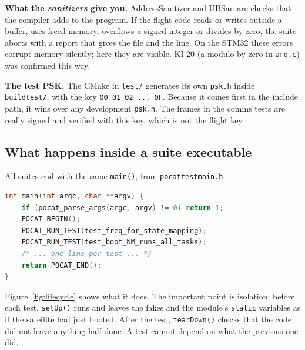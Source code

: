 \documentclass[11pt,a4paper]{article}
\DeclareRobustCommand{\_}{\textunderscore\allowbreak}
\newcommand{\cd}[1]{\texttt{#1}}
\begin{document}
\textbf{What the \emph{sanitizers} give you.} AddressSanitizer and UBSan are checks that
the compiler adds to the program. If the flight code reads or writes outside a buffer,
uses freed memory, overflows a signed integer or divides by zero, the suite
aborts with a report that gives the file and the line. On the STM32 these errors corrupt
memory silently; here they are visible. KI-20 (a modulo by zero in \cd{arq.c}) was confirmed
this way.

\textbf{The test PSK.} The CMake in \cd{test/} generates its own \cd{psk.h} inside
\cd{build\_test/}, with the key \cd{00 01 02 ... 0F}. Because it comes first in the include
path, it wins over any development \cd{psk.h}. The frames in the comms tests are
really signed and verified with this key, which is not the flight key.

\subsection{What happens inside a suite executable}

All suites end with the same \cd{main()}, from \cd{pocat\_test\_main.h}:
\begin{lstlisting}[language=C]
int main(int argc, char **argv) {
    if (pocat_parse_args(argc, argv) != 0) return 1;
    POCAT_BEGIN();
    POCAT_RUN_TEST(test_freq_for_state_mapping);
    POCAT_RUN_TEST(test_boot_NM_runs_all_tasks);
    /* ... one line per test ... */
    return POCAT_END();
}
\end{lstlisting}
Figure~\ref{fig:lifecycle} shows what it does. The important point is isolation: before
each test, \cd{setUp()} runs and leaves the fakes and the module's \cd{static} variables as if
the satellite had just booted. After the test, \cd{tearDown()} checks that the code did not
leave anything half done. A test cannot depend on what the previous one did.
\end{document}
